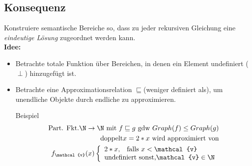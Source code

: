 \subsection{Konsequenz}
Konstruiere semantische Bereiche so, dass zu jeder rekursiven Gleichung eine \emph{eindeutige Lösung} zugeordnet werden kann.\\
\textbf{Idee:} 
\begin{itemize}
	\item Betrachte totale Funktion über Bereichen, in denen ein Element undefiniert ($\perp$) hinzugefügt ist.
	\item Betrachte eine Approximationsrelation $\sqsubseteq$(weniger definiert als), um unendliche Objekte durch endliche zu approximieren.
	\item[Beispiel]
	\begin{align*}
		\text{Part. Fkt.} \N \rightarrow \N \text{ mit } f \sqsubseteq g \text{ gdw } Graph(f) \leq Graph(g)\\
		\text{doppelt} x = 2 * x \text{ wird approximiert von}\\
		f_{\mathcal{v}}(x)
		\left\lbrace\begin{array}{l l}
		2*x\text{,} \quad\text{falls } x<\mathcal{v}\\
		\text{undefiniert sonst,} \mathcal{v} \in \N \\ 
		\end{array}\right.\\
	\end{align*}
\end{itemize}

